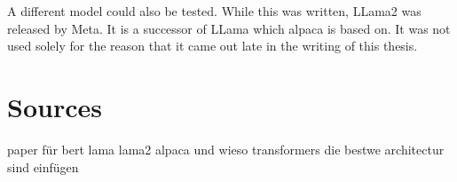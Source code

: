 A different model could also be tested. While this was written,  LLama2  was released by Meta. It is a successor of LLama which alpaca is based on. It was not used solely for the reason that it came out late in the writing of this thesis.






\section{Sources}

paper für bert lama lama2 alpaca und wieso transformers die bestwe architectur sind einfügen